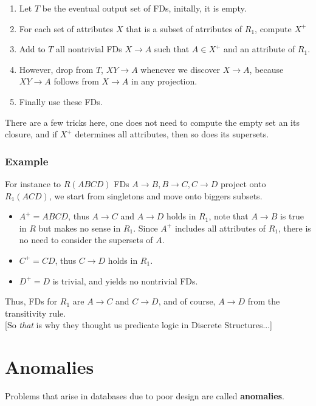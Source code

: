 \documentclass[11pt,a4paper,twocolumn]{book}
\begin{document}
\begin{enumerate}
\item Let $T$ be the eventual output set of FDs, initally, it is empty.
\item For each set of attributes $X$ that is a subset of atrributes of $R_1$, compute $X^+$
\item Add to $T$ all nontrivial FDs $X \to A$ such that $A \in X^+$ and an attribute of $R_1$.
\item However, drop from $T$, $XY \to A$ whenever we discover $X \to A$, because $XY \to A$ follows from $X \to A$ in any projection.
\item Finally use these FDs.
\end{enumerate}

There are a few tricks here, one does not need to compute the empty set an its closure, and if $X^+$ determines all attributes, then so does its supersets.\\

\subsubsection{Example}

For instance to $R(ABCD)$ FDs $A \to B, B \to C, C \to D$ project onto $R_1(ACD)$, we start from singletons and move onto biggers subsets. 

\begin{itemize}
\item $A^+ = ABCD$, thus $A \to C$ and $A \to D$ holds in $R_1$, note that $A \to B$ is true in $R$ but makes no sense in $R_1$. Since $A^+$ includes all attributes of $R_1$, there is no need to consider the supersets of $A$. 
\item $C^+ = CD$, thus $C \to D$ holds in $R_1$.
\item $D^+ = D$ is trivial, and yields no nontrivial FDs.
\end{itemize}

Thus, FDs for $R_1$ are $A \to C$ and $C \to D$, and of course, $A \to D$ from the transitivity rule.\\

[So \textit{that} is why they thought us predicate logic in Discrete Structures...]

\section{Anomalies}

Problems that arise in databases due to poor design are called \textbf{anomalies}.
\end{document}
